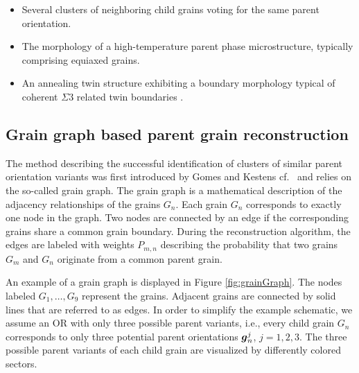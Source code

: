 \documentclass{elsarticle}
\renewcommand{\vec}[1]{\ensuremath \mathbf{\boldsymbol{#1}}}
\numberwithin{equation}{section}
\begin{document}
\begin{itemize}
    \item Several clusters of neighboring child grains voting for the same parent orientation.
    \item The morphology of a high-temperature parent phase microstructure, typically comprising equiaxed grains.
    \item An annealing twin structure exhibiting a boundary morphology typical of coherent $\Sigma 3$ related twin boundaries  \cite{Mahajan1996}.
\end{itemize}



\subsection{Grain graph based parent grain reconstruction}
\label{sec:graph-based-reconstr}
The method describing the successful identification of clusters of similar parent orientation variants was first introduced by Gomes and Kestens cf.~\cite{GomesdeAraujo2021} and relies on the so-called grain graph. The grain graph is a mathematical description of the adjacency relationships of the grains $G_n$. Each grain $G_n$ corresponds to exactly one node in the graph. Two nodes are connected by an edge if the corresponding grains share a common grain boundary. During the reconstruction algorithm, the edges are labeled with weights $P_{m,n}$ describing the probability that two grains $G_m$ and $G_n$ originate from a common parent grain.  

An example of a grain graph is displayed in Figure \ref{fig:grainGraph}. 
The nodes labeled $G_1,\ldots,G_9$ represent the grains. Adjacent grains are connected by solid lines that are referred to as edges. In order to simplify the example schematic, we assume an OR with only three possible parent variants, i.e., every child grain $G_n$ corresponds to only three potential parent orientations $\vec g_n^j$, $j=1,2,3$. The three possible parent variants of each child grain are visualized by differently colored sectors. 

\end{document}
